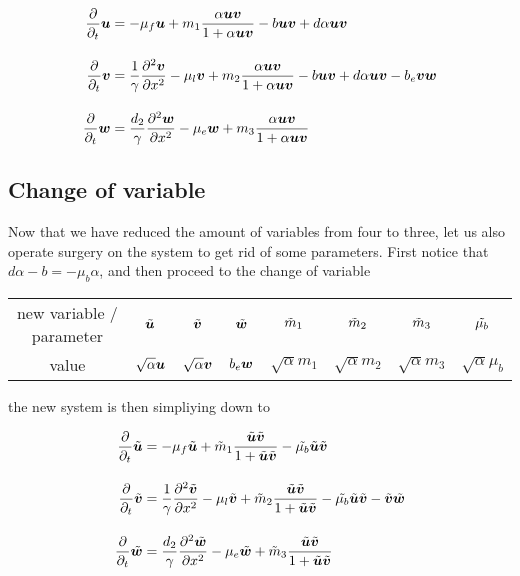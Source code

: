 \begin{align}
    \dfrac{\partial}{\partial_t} \bm{u} &= -\mu_f \bm{u} + m_1 \dfrac{\alpha \bm{u} \bm{v}}{1 + \alpha \bm{u} \bm{v}} - b \bm{u} \bm{v} + d \alpha \bm{u} \bm{v} \notag \\[1em]
    \dfrac{\partial}{\partial_t} \bm{v} &= \dfrac{1}{\gamma} \frac{\partial^2 \bm{v}}{\partial x^2} - \mu_l \bm{v} + m_2 \dfrac{\alpha \bm{u} \bm{v}}{1 + \alpha \bm{u}\bm{v}} - b \bm{u} \bm{v} + d \alpha \bm{u} \bm{v} - b_e \bm{v}\bm{w}  \\[1em]
    \dfrac{\partial}{\partial_t} \bm{w} &= \dfrac{d_2}{\gamma} \frac{\partial^2 \bm{w}}{\partial x^2} - \mu_e \bm{w} + m_3 \dfrac{\alpha\bm{u}\bm{v}}{1 + \alpha\bm{u}\bm{v}} \notag
\end{align}

\subsection{Change of variable}

Now that we have reduced the amount of variables from four to three, let us also operate surgery on the system to get rid of some parameters. First notice that $d\alpha - b = -\mu_b \alpha$, and then proceed to the change of variable 

\begin{center}
\begin{tabular}{cccccccc}
	new variable / parameter & $\Tilde{\bm{u}}$ & $ \Tilde{\bm{v}}$ & $ \Tilde{\bm{w}}$ & $\Tilde{m}_1 $ & $\Tilde{m}_2$ & $\Tilde{m}_3$ & $\Tilde{\mu_b}$  \\[0.8em]
	value & $\sqrt{\alpha} \bm{u}$ & $\sqrt{\alpha} \bm{v}$ & $b_e \bm{w}$ & $\sqrt{\alpha} m_1$ & $\sqrt{\alpha} m_2$ & $\sqrt{\alpha} m_3$ &  $\sqrt{\alpha} \mu_b $
\end{tabular}
\end{center}

the new system is then simpliying down to

\begin{align}
	\label{system}
	 \dfrac{\partial}{\partial_t} \Tilde{\bm{u}} &= -\mu_f \Tilde{\bm{u}} + \Tilde{m}_1 \dfrac{ \Tilde{\bm{u}} \Tilde{\bm{v}}}{1 +  \Tilde{\bm{u}} \Tilde{\bm{v}}} - \Tilde{\mu_b} \Tilde{\bm{u}} \Tilde{ \bm{v}}  \notag \\[1em]
	\dfrac{\partial}{\partial_t} \Tilde{\bm{v}} &= \dfrac{1}{\gamma} \frac{\partial^2 \Tilde{\bm{v}}}{\partial x^2} - \mu_l  \Tilde{\bm{v}} +\Tilde{ m}_2 \dfrac{ \Tilde{\bm{u}} \Tilde{\bm{v}}}{1 +  \Tilde{\bm{u}}\Tilde{\bm{v}}} - \Tilde{\mu_b} \Tilde{ \bm{u}} \Tilde{ \bm{v}} - \Tilde{\bm{v}} \Tilde{\bm{w}}  \\[1em]
	\dfrac{\partial}{\partial_t} \Tilde{\bm{w}} &= \dfrac{d_2}{\gamma} \frac{\partial^2 \Tilde{\bm{w}}}{\partial x^2} - \mu_e\Tilde{ \bm{w}} + \Tilde{m}_3 \dfrac{\Tilde{\bm{u}}\Tilde{\bm{v}}}{1 + \Tilde{\bm{u}}\Tilde{\bm{v}}} \notag
\end{align}

